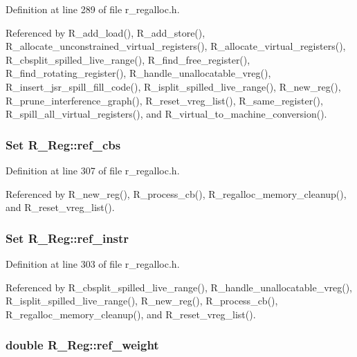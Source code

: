 Definition at line 289 of file r\_\-regalloc.h.

Referenced by R\_\-add\_\-load(), R\_\-add\_\-store(), R\_\-allocate\_\-unconstrained\_\-virtual\_\-registers(), R\_\-allocate\_\-virtual\_\-registers(), R\_\-cbsplit\_\-spilled\_\-live\_\-range(), R\_\-find\_\-free\_\-register(), R\_\-find\_\-rotating\_\-register(), R\_\-handle\_\-unallocatable\_\-vreg(), R\_\-insert\_\-jsr\_\-spill\_\-fill\_\-code(), R\_\-isplit\_\-spilled\_\-live\_\-range(), R\_\-new\_\-reg(), R\_\-prune\_\-interference\_\-graph(), R\_\-reset\_\-vreg\_\-list(), R\_\-same\_\-register(), R\_\-spill\_\-all\_\-virtual\_\-registers(), and R\_\-virtual\_\-to\_\-machine\_\-conversion().
\subsubsection{\setlength{\rightskip}{0pt plus 5cm}\bf{Set} \bf{R\_\-Reg::ref\_\-cbs}}\label{structR__Reg_7e1242a168a99f30b72fca52198600e1}




Definition at line 307 of file r\_\-regalloc.h.

Referenced by R\_\-new\_\-reg(), R\_\-process\_\-cb(), R\_\-regalloc\_\-memory\_\-cleanup(), and R\_\-reset\_\-vreg\_\-list().
\subsubsection{\setlength{\rightskip}{0pt plus 5cm}\bf{Set} \bf{R\_\-Reg::ref\_\-instr}}\label{structR__Reg_7654d5589117662ab0aeb2becbc55eae}




Definition at line 303 of file r\_\-regalloc.h.

Referenced by R\_\-cbsplit\_\-spilled\_\-live\_\-range(), R\_\-handle\_\-unallocatable\_\-vreg(), R\_\-isplit\_\-spilled\_\-live\_\-range(), R\_\-new\_\-reg(), R\_\-process\_\-cb(), R\_\-regalloc\_\-memory\_\-cleanup(), and R\_\-reset\_\-vreg\_\-list().
\subsubsection{\setlength{\rightskip}{0pt plus 5cm}double \bf{R\_\-Reg::ref\_\-weight}}\label{structR__Reg_e42f1c52d6c29a1428d2ed51ffc43e9f}




